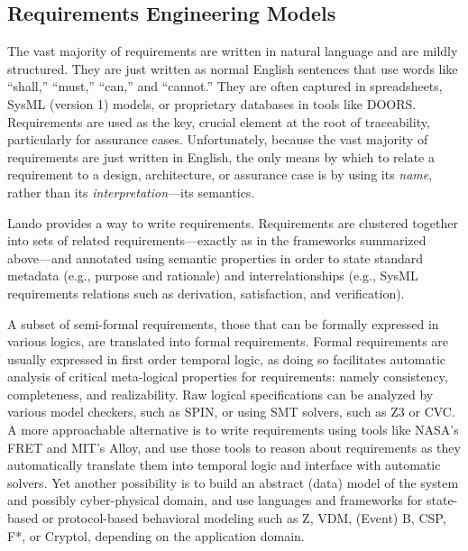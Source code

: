 \documentclass[10pt,letterpaper]{article}
\begin{document}
\subsection{Requirements Engineering Models}
\label{requirements-engineering-models}

The vast majority of requirements are written in natural language and are mildly structured. They are just written as normal English sentences that use words like ``shall,'' ``must,'' ``can,'' and ``cannot.'' They are often captured in spreadsheets, SysML (version 1) models, or proprietary databases in tools like DOORS. Requirements are used as the key, crucial element at the root of traceability, particularly for assurance cases. Unfortunately, because the vast majority of requirements are just written in English, the only means by which to relate a requirement to a design, architecture, or assurance case is by using its \emph{name}, rather than its \emph{interpretation}---its semantics.

Lando provides a way to write requirements. Requirements are clustered together into sets of related requirements---exactly as in the frameworks summarized above---and annotated using semantic properties in order to state standard metadata (e.g., purpose and rationale) and interrelationships (e.g., SysML requirements relations such as derivation, satisfaction, and verification).

A subset of semi-formal requirements, those that can be formally expressed in various logics, are translated into formal requirements. Formal requirements are usually expressed in first order temporal logic, as doing so facilitates automatic analysis of critical meta-logical properties for requirements: namely consistency, completeness, and realizability. Raw logical specifications can be analyzed by various model checkers, such as SPIN, or using SMT solvers, such as Z3 or CVC. A more approachable alternative is to write requirements using tools like NASA's FRET and MIT's Alloy, and use those tools to reason about requirements as they automatically translate them into temporal logic and interface with automatic solvers. Yet another possibility is to build an abstract (data) model of the system and possibly cyber-physical domain, and use languages and frameworks for state-based or protocol-based behavioral modeling such as Z, VDM, (Event) B, CSP, F*, or Cryptol, depending on the application domain.
\end{document}
